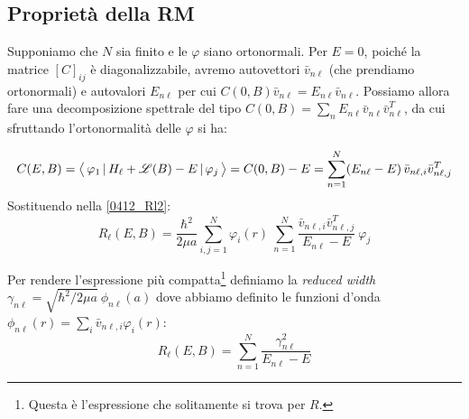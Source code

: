 \subsection{Proprietà della RM}
Supponiamo che $N$ sia finito e le $\varphi$ siano ortonormali. Per $E=0$, poiché la matrice $[C]_{ij}$ è diagonalizzabile, avremo autovettori $\bar{v}_{n\ell}$ (che prendiamo ortonormali) e autovalori $E_{n\ell}$ per cui $C(0,B)\bar{v}_{n\ell} = E_{n\ell} \bar{v}_{n\ell}$. Possiamo allora fare una decomposizione spettrale del tipo $C(0,B) = \sum_n E_{n\ell} \bar{v}_{n\ell} \bar{v}^T_{n\ell}$, da cui sfruttando l'ortonormalità delle $\varphi$ si ha:

$$ C(E,B) = \bigl\langle\, \varphi_1\, |\,H_\ell + \mathscr{L}(B) - E\, |\,\varphi_j\, \bigr\rangle = C(0,B) - E = \sum_{n=1}^N (E_{n\ell} - E)\, \bar{v}_{n\ell,i}\bar{v}^T_{n\ell,j}$$
Sostituendo nella \eqref{0412_Rl2}:
$$R_\ell (E,B) = \frac{\hbar^2}{2\mu a} \sum_{i,j =1}^N \varphi_i(r) \: \sum_{n=1}^{N} \frac{\bar{v}_{n\ell,i}\bar{v}^T_{n\ell,j}}{E_{n\ell}-E} \: \varphi_j$$ 

Per rendere l'espressione più compatta\footnote{Questa è l'espressione che solitamente si trova per $R$.} definiamo la \textit{reduced width} $\gamma_{n\ell} = \sqrt{\hbar^2/2\mu a} \: \phi_{n\ell}(a)$ dove abbiamo definito le funzioni d'onda $\phi_{n\ell}(r) = \sum_i \bar{v}_{n\ell,i}\varphi_i(r)$:
\begin{equation}\label{0412_Rl3}
R_\ell (E,B) = \sum_{n=1}^N \frac{\gamma_{n\ell}^2}{E_{n\ell}-E}	
\end{equation}

